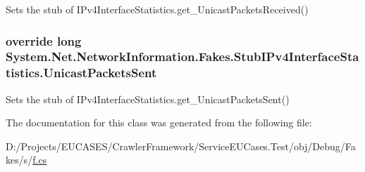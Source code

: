 Sets the stub of I\-Pv4\-Interface\-Statistics.\-get\-\_\-\-Unicast\-Packets\-Received()

\hypertarget{class_system_1_1_net_1_1_network_information_1_1_fakes_1_1_stub_i_pv4_interface_statistics_a3bfd2fbcc94ba60b781157e478443a20}{
\subsubsection[{Unicast\-Packets\-Sent}]{\setlength{\rightskip}{0pt plus 5cm}override long System.\-Net.\-Network\-Information.\-Fakes.\-Stub\-I\-Pv4\-Interface\-Statistics.\-Unicast\-Packets\-Sent\hspace{0.3cm}{\ttfamily [get]}}}\label{class_system_1_1_net_1_1_network_information_1_1_fakes_1_1_stub_i_pv4_interface_statistics_a3bfd2fbcc94ba60b781157e478443a20}


Sets the stub of I\-Pv4\-Interface\-Statistics.\-get\-\_\-\-Unicast\-Packets\-Sent()



The documentation for this class was generated from the following file\-:\begin{DoxyCompactItemize}
\item 
D\-:/\-Projects/\-E\-U\-C\-A\-S\-E\-S/\-Crawler\-Framework/\-Service\-E\-U\-Cases.\-Test/obj/\-Debug/\-Fakes/s/\hyperlink{s_2f_8cs}{f.\-cs}\end{DoxyCompactItemize}
